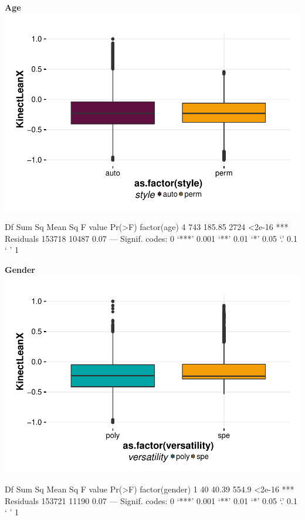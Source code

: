 \documentclass{article}
\begin{document}
\textbf{Age}
\includegraphics{features-plot_leanx_style_quiz}

\begin{Schunk}
\begin{Soutput}
                Df Sum Sq Mean Sq F value Pr(>F)    
factor(age)      4    743  185.85    2724 <2e-16 ***
Residuals   153718  10487    0.07                   
---
Signif. codes:  0 ‘***’ 0.001 ‘**’ 0.01 ‘*’ 0.05 ‘.’ 0.1 ‘ ’ 1
\end{Soutput}
\end{Schunk}

\textbf{Gender}
\includegraphics{features-plot_leanx_gender_quiz}

\begin{Schunk}
\begin{Soutput}
                   Df Sum Sq Mean Sq F value Pr(>F)    
factor(gender)      1     40   40.39   554.9 <2e-16 ***
Residuals      153721  11190    0.07                   
---
Signif. codes:  0 ‘***’ 0.001 ‘**’ 0.01 ‘*’ 0.05 ‘.’ 0.1 ‘ ’ 1
\end{Soutput}
\end{Schunk}
\end{document}
